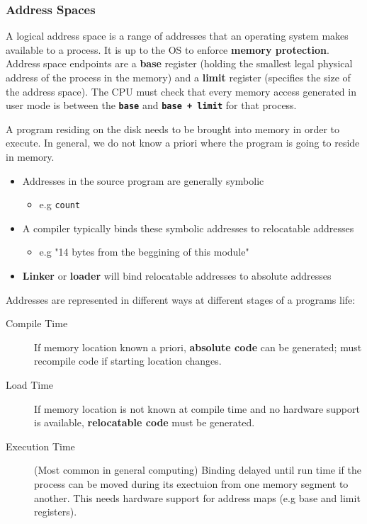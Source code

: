 \documentclass{article}%
\begin{document}
\subsubsection{Address Spaces}
\label{sec:org3535c17}
A logical address space is a range of addresses that an operating system makes available to a process.
It is up to the OS to enforce \textbf{memory protection}.
Address space endpoints are a \textbf{base} register (holding the smallest legal physical address of the process in the memory) and a \textbf{limit} register (specifies the size of the address space).
The CPU must check that every memory access generated in user mode is between the \textbf{\texttt{base}} and \textbf{\texttt{base + limit}} for that process.

A program residing on the disk needs to be brought into memory in order to execute.
In general, we do not know a priori where the program is going to reside in memory.

\begin{itemize}
\item Addresses  in the source program are generally symbolic
\begin{itemize}
\item e.g \texttt{count}
\end{itemize}
\item A compiler typically binds these symbolic addresses to relocatable addresses
\begin{itemize}
\item e.g "14 bytes from the beggining of this module"
\end{itemize}
\item \textbf{Linker} or \textbf{loader} will bind relocatable addresses to absolute addresses
\end{itemize}
Addresses are represented in different ways at different stages of a programs life:
\begin{description}
\item[{Compile Time}] If memory location known a priori, \textbf{absolute code} can be generated; must recompile code if starting location changes.
\item[{Load Time}] If memory location is not known at compile time and no hardware support is available, \textbf{relocatable code} must be generated.
\item[{Execution Time}] (Most common in general computing) Binding delayed until run time if the process can be moved during its exectuion from one memory segment to another. This needs hardware support for address maps (e.g base and limit registers).
\end{description}
\end{document}
